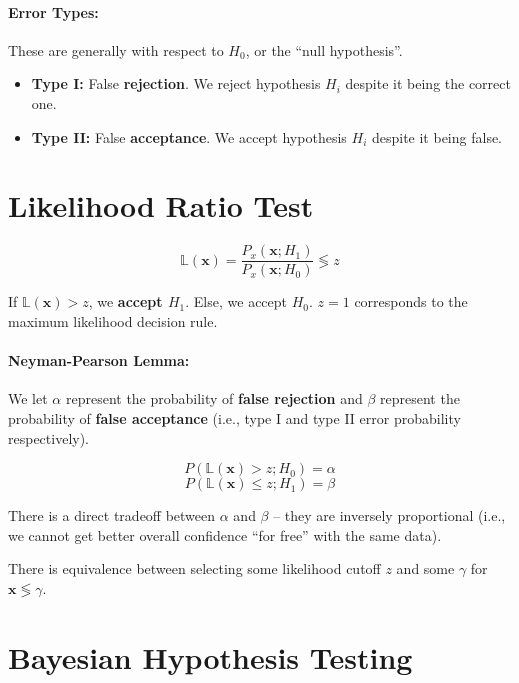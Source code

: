 \documentclass[a4paper,12pt]{report}
\begin{document}
\paragraph{Error Types: } These are generally with respect to $H_0$, or the ``null hypothesis''.
\begin{itemize}
\item \textbf{Type I:} False \textbf{rejection}. We reject hypothesis $H_i$ despite it being the correct one.
\item \textbf{Type II:} False \textbf{acceptance}. We accept hypothesis $H_i$ despite it being false.
\end{itemize}


\section{Likelihood Ratio Test}

\begin{equation}
\mathbb L(\pmb x) = \frac{P_x(\pmb x; H_1)}{P_x(\pmb x; H_0)} \lessgtr z
\end{equation}

If $\mathbb L(\pmb x) > z$, we \textbf{accept $H_1$}. Else, we accept $H_0$. $z = 1$ corresponds to the maximum likelihood decision rule.

\paragraph{Neyman-Pearson Lemma: } We let $\alpha$ represent the probability of \textbf{false rejection} and $\beta$ represent the probability of \textbf{false acceptance} (i.e., type I and type II error probability respectively).

\begin{equation}
P(\mathbb L(\pmb x) > z ; H_0) = \alpha
\end{equation}
\begin{equation}
P(\mathbb L(\pmb x) \leq z ; H_1) = \beta
\end{equation}

There is a direct tradeoff between $\alpha$ and $\beta$ -- they are inversely proportional (i.e., we cannot get better overall confidence ``for free'' with the same data).

There is equivalence between selecting some likelihood cutoff $z$ and some $\gamma$ for $\pmb x \lessgtr \gamma$. 

\section{Bayesian Hypothesis Testing}
\end{document}
